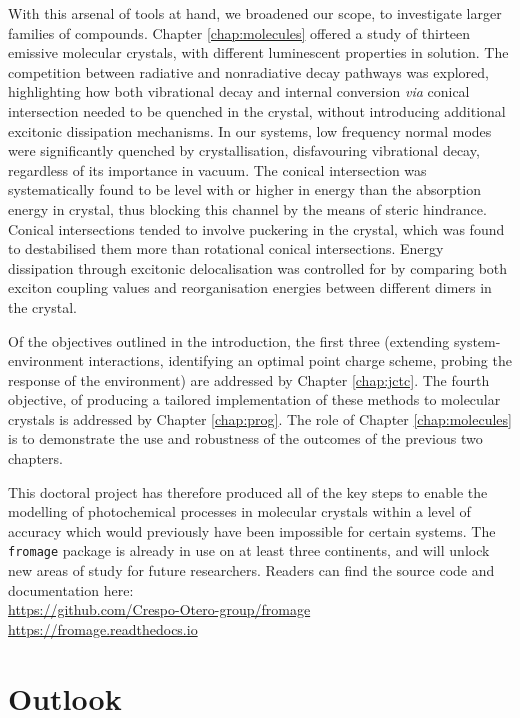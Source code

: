 With this arsenal of tools at hand, we broadened our scope, to investigate larger families of compounds. Chapter \ref{chap:molecules} offered a study of thirteen emissive molecular crystals, with different luminescent properties in solution. The competition between radiative and nonradiative decay pathways was explored, highlighting how both vibrational decay and internal conversion \textit{via} conical intersection needed to be quenched in the crystal, without introducing additional excitonic dissipation mechanisms. In our systems, low frequency normal modes were significantly quenched by crystallisation, disfavouring vibrational decay, regardless of its importance in vacuum. The conical intersection was systematically found to be level with or higher in energy than the absorption energy in crystal, thus blocking this channel by the means of steric hindrance. Conical intersections tended to involve puckering in the crystal, which was found to destabilised them more than rotational conical intersections. Energy dissipation through excitonic delocalisation was controlled for by comparing both exciton coupling values and reorganisation energies between different dimers in the crystal.

Of the objectives outlined in the introduction, the first three (extending system-environment interactions, identifying an optimal point charge scheme, probing the response of the environment) are addressed by Chapter \ref{chap:jctc}. The fourth objective, of producing a tailored implementation of these methods to molecular crystals is addressed by Chapter \ref{chap:prog}. The role of Chapter \ref{chap:molecules} is to demonstrate the use and robustness of the outcomes of the previous two chapters.

This doctoral project has therefore produced all of the key steps to enable the modelling of photochemical processes in molecular crystals within a level of accuracy which would previously have been impossible for certain systems. The \texttt{fromage} package is already in use on at least three continents, and will unlock new areas of study for future researchers. Readers can find the source code and documentation here:\\
\href{https://github.com/Crespo-Otero-group/fromage}{https://github.com/Crespo-Otero-group/fromage}\\
\href{https://fromage.readthedocs.io}{https://fromage.readthedocs.io}

\section*{Outlook}
